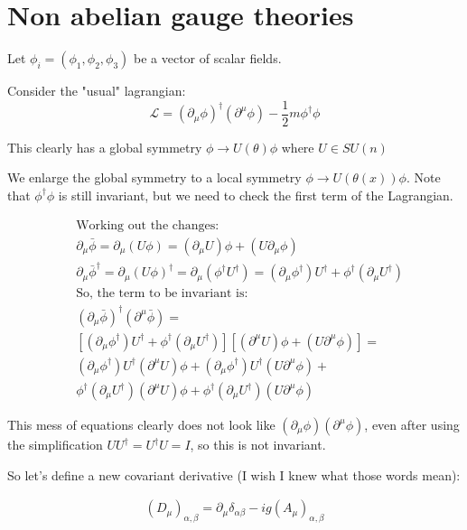 \newcommand{\Lag}{\mathcal{L}}
\chapter{Non abelian gauge theories}

Let $\phi_i = (\phi_1, \phi_2, \phi_3)$ be a vector of scalar fields.

Consider the "usual" lagrangian:
$$\Lag = (\partial_\mu \phi)^\dagger (\partial^\mu \phi) - \frac{1}{2}m \phi^\dagger \phi$$

This clearly has a global symmetry $\phi \to U(\theta) \phi$ where $U \in SU(n)$

We enlarge the global symmetry to a local symmetry $\phi \to U(\theta(x)) \phi$.
Note that $\phi^\dagger \phi$ is still invariant, but we need to check
the first term of the Lagrangian.

\begin{align*}
    &\text{Working out the changes:} \\
    &\partial_\mu \bar \phi = \partial_\mu (U \phi) = (\partial_\mu U) \phi + (U \partial_\mu \phi) \\
    &\partial_\mu {\bar \phi}^\dagger = \partial_\mu (U \phi)^\dagger =  \partial_\mu (\phi^\dagger U^\dagger) = 
    (\partial_\mu \phi^\dagger) U^\dagger + \phi^\dagger (\partial_\mu U^\dagger)
    \\
    &\text{So, the term to be invariant is:} \\
    &(\partial_\mu \bar \phi)^\dagger (\partial^\mu \bar \phi) =  \\
    &[(\partial_\mu \phi^\dagger) U^\dagger + \phi^\dagger (\partial_\mu U^\dagger)][(\partial^\mu U) \phi + (U \partial^\mu \phi) ] =  \\
    &(\partial_\mu \phi^\dagger) U^\dagger    (\partial^\mu U) \phi + 
    (\partial_\mu \phi^\dagger) U^\dagger    (U \partial^\mu \phi) + \\
    &\phi^\dagger (\partial_\mu U^\dagger)    (\partial^\mu U) \phi + 
    \phi^\dagger (\partial_\mu U^\dagger)     (U \partial^\mu \phi) 
\end{align*}

This mess of equations clearly does not look like
$(\partial_\mu \phi) (\partial^\mu \phi)$,
even after using the simplification $U U^\dagger = U^\dagger U = I$,
so this is not invariant.

So let's define a new covariant derivative (I wish I knew what those words mean):

\begin{align*}
    (D_\mu)_{\alpha, \beta} = \partial_\mu \delta_{\alpha \beta} - i g (A_\mu)_{\alpha, \beta}
\end{align*}

